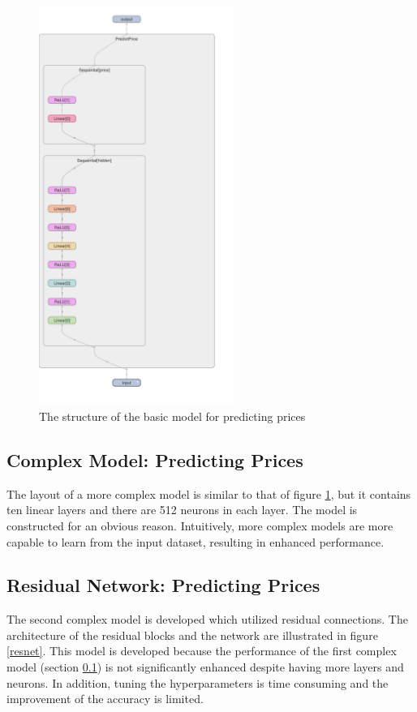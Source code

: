 \documentclass[12pt,twoside]{report}
\begin{document}
\begin{figure}[h]
	\centering
	\includegraphics[height=13cm]{basic_model_price}
	\caption{The structure of the basic model for predicting prices}
	\label{basic_model_price}
\end{figure}

\subsection{Complex Model: Predicting Prices}
\label{complex_model_construct}
The layout of a more complex model is similar to that of figure \ref{basic_model_price}, but it contains ten linear layers and there are 512 neurons in each layer. The model is constructed for an obvious reason. Intuitively, more complex models are more capable to learn from the input dataset, resulting in enhanced performance. 

\subsection{Residual Network: Predicting Prices}
The second complex model is developed which utilized residual connections. The architecture of the residual blocks and the network are illustrated in figure \ref{resnet}. This model is developed because the performance of the first complex model (section \ref{complex_model_construct}) is not significantly enhanced despite having more layers and neurons. In addition, tuning the hyperparameters is time consuming and the improvement of the accuracy is limited. 
\end{document}
